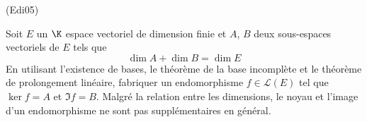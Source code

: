 \begin{tiny}(Edi05)\end{tiny}
Soit $E$ un $\K$ espace vectoriel de dimension finie et $A$, $B$ deux sous-espaces vectoriels de $E$ tels que
\begin{displaymath}
 \dim A + \dim B = \dim E
\end{displaymath}
En utilisant l'existence de bases, le théorème de la base incomplète et le théorème de prolongement linéaire, fabriquer un endomorphisme $f\in \mathcal L(E)$ tel que $\ker f =A$ et $\Im f = B$. Malgré la relation entre les dimensions, le noyau et l'image d'un endomorphisme ne sont pas supplémentaires en général.